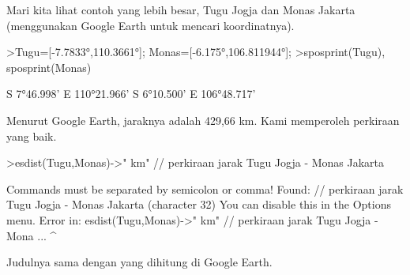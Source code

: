 \documentclass[a4paper,10pt]{article}
\begin{document}
\begin{eulernotebook}
\begin{eulercomment}
\begin{eulercomment}
\begin{eulercomment}
\begin{eulercomment}
\begin{eulercomment}
\begin{eulercomment}
\begin{eulercomment}
\begin{eulercomment}
\begin{eulercomment}
\begin{eulercomment}
\begin{eulercomment}
\begin{eulercomment}
\begin{eulercomment}
\begin{eulercomment}
\begin{eulercomment}
\begin{eulercomment}
\begin{eulercomment}
\begin{eulercomment}
\begin{eulercomment}
\begin{eulercomment}
\begin{eulercomment}
\begin{eulercomment}
\begin{eulercomment}
\begin{eulercomment}
\begin{eulercomment}
\begin{eulercomment}
\begin{eulercomment}
\begin{eulercomment}
\begin{eulercomment}
\begin{eulercomment}
\begin{eulercomment}
\begin{eulercomment}
\begin{eulercomment}
\begin{eulercomment}
\begin{eulercomment}
\begin{eulercomment}
\begin{eulercomment}
\begin{eulercomment}
\begin{eulercomment}
\begin{eulercomment}
\begin{eulercomment}
\begin{eulercomment}
\begin{euleroutput}
\end{euleroutput}
\begin{eulercomment}
Mari kita lihat contoh yang lebih besar, Tugu Jogja dan Monas Jakarta
(menggunakan Google Earth untuk mencari koordinatnya).
\end{eulercomment}
\begin{eulerprompt}
>Tugu=[-7.7833°,110.3661°]; Monas=[-6.175°,106.811944°];
>sposprint(Tugu), sposprint(Monas)
\end{eulerprompt}
\begin{euleroutput}
  S 7°46.998' E 110°21.966'
  S 6°10.500' E 106°48.717'
\end{euleroutput}
\begin{eulercomment}
Menurut Google Earth, jaraknya adalah 429,66 km. Kami memperoleh
perkiraan yang baik.
\end{eulercomment}
\begin{eulerprompt}
>esdist(Tugu,Monas)->" km" // perkiraan jarak Tugu Jogja - Monas Jakarta
\end{eulerprompt}
\begin{euleroutput}
  Commands must be separated by semicolon or comma!
  Found:  // perkiraan jarak Tugu Jogja - Monas Jakarta (character 32)
  You can disable this in the Options menu.
  Error in:
  esdist(Tugu,Monas)->" km" // perkiraan jarak Tugu Jogja - Mona ...
                           ^
\end{euleroutput}
\begin{eulercomment}
Judulnya sama dengan yang dihitung di Google Earth.
\end{eulercomment}

\end{eulercomment}
\end{eulercomment}
\end{eulercomment}
\end{eulercomment}
\end{eulercomment}
\end{eulercomment}
\end{eulercomment}
\end{eulercomment}
\end{eulercomment}
\end{eulercomment}
\end{eulercomment}
\end{eulercomment}
\end{eulercomment}
\end{eulercomment}
\end{eulercomment}
\end{eulercomment}
\end{eulercomment}
\end{eulercomment}
\end{eulercomment}
\end{eulercomment}
\end{eulercomment}
\end{eulercomment}
\end{eulercomment}
\end{eulercomment}
\end{eulercomment}
\end{eulercomment}
\end{eulercomment}
\end{eulercomment}
\end{eulercomment}
\end{eulercomment}
\end{eulercomment}
\end{eulercomment}
\end{eulercomment}
\end{eulercomment}
\end{eulercomment}
\end{eulercomment}
\end{eulercomment}
\end{eulercomment}
\end{eulercomment}
\end{eulercomment}
\end{eulercomment}
\end{eulercomment}
\end{eulernotebook}
\end{document}
